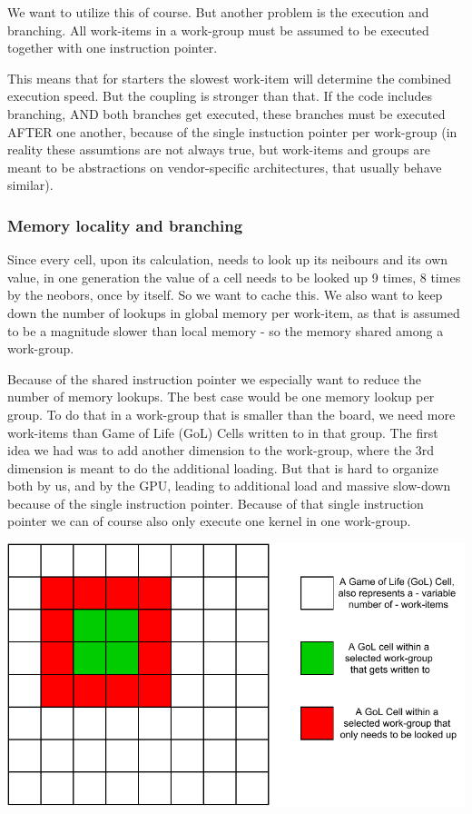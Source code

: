 \documentclass[a4paper,english,12pt,twoside=false]{scrartcl} %
\begin{document}
We want to utilize this of course. But another problem is the execution and branching. 
All work-items in a work-group must be assumed to be executed together with one instruction pointer.

This means that for starters the slowest work-item will determine the combined execution speed. 
But the coupling is stronger than that. If the code includes branching, AND both branches get executed,
these branches must be executed AFTER one another, because of the single instuction pointer per work-group 
(in reality these assumtions are not always true, but work-items and groups are meant to be abstractions on 
vendor-specific architectures, that usually behave similar).

\subsubsection{Memory locality and branching}

Since every cell, upon its calculation, needs to look up its neibours and its own value, in one generation the value of 
a cell needs to be looked up 9 times, 8 times by the neobors, once by itself. So we want to cache this.
We also want to keep down the number of lookups in global memory per work-item, as that is assumed to be a magnitude slower 
than local memory - so the memory shared among a work-group.

Because of the shared instruction pointer we especially want to reduce the number of memory lookups. 
The best case would be one memory lookup per group.
To do that in a work-group that is smaller than the board, we need more work-items than Game of Life (GoL) Cells written to in that group.
The first idea we had was to add another dimension to the work-group, where the 3rd dimension is meant to do the additional loading. 
But that is hard to organize both by us, and by the GPU, leading to additional load and massive slow-down because of the single instruction pointer.
Because of that single instruction pointer we can of course also only execute one kernel in one work-group.

{
    \centering
    \label{fig:cl-mem-access}
    \includegraphics[width=\linewidth]{imgs/opencl_mem_access.drawio.pdf}
}
\end{document}
